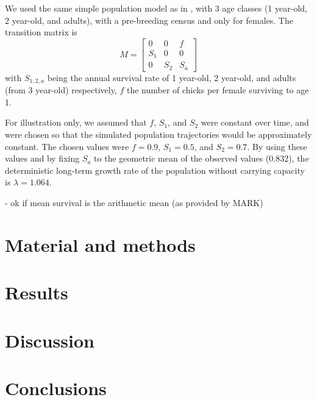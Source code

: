 \documentclass[preprint,authoryear,12pt]{elsarticle}
\begin{document}
We used the same simple population model as in
\citet{frederiksen_demographic_2008}, with 3 age classes (1 year-old,
2 year-old, and adults), with a pre-breeding census and only for
females.  The transition matrix is
\[
M = \begin{bmatrix}
0    & 0    & f   \\ 
S_{1} & 0    & 0   \\ 
0    & S_{2} & S_{a}
\end{bmatrix}
\]
with $S_{1,2,a}$ being the annual survival rate of 1 year-old, 2
year-old, and adults (from 3 year-old) respectively, $f$ the number of
chicks per female surviving to age 1.

For illustration only, we assumed that $f$, $S_{1}$, and $S_{2}$ were
constant over time, and were chosen so that the simulated population
trajectories would be approximately constant. The chosen values were
$f=0.9$, $S_{1}=0.5$, and $S_{2}=0.7$. By using these values and by
fixing $S_{a}$ to the geometric mean of the observed values (0.832),
the deterministic long-term growth rate of the population without
carrying capacity is $\lambda = 1.064$.



- ok if mean survival is the arithmetic mean (as provided by MARK)





\section{Material and methods}
\label{sec:methods}

\section{Results}
\label{sec:results}

\section{Discussion}
\label{sec:discussion}

\section{Conclusions}
\label{sec:conclusions}
\end{document}
